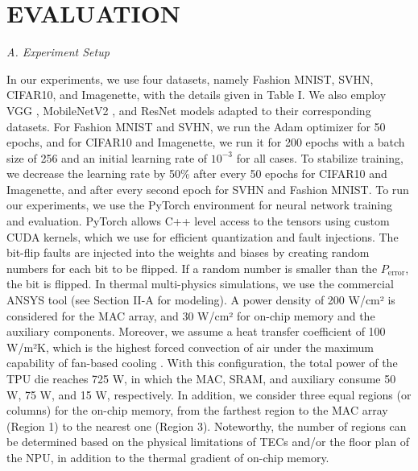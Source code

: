 \documentclass[sigconf]{acmart}
\begin{document}
\section{EVALUATION}
\textit{A. Experiment Setup}

In our experiments, we use four datasets, namely Fashion MNIST, SVHN, CIFAR10, and Imagenette, with the details given in Table I. We also employ VGG \cite{ref14} , MobileNetV2 \cite{ref15}, and ResNet \cite{ref16} models adapted to their corresponding datasets. For Fashion MNIST and SVHN, we run the Adam optimizer for 50 epochs, and for CIFAR10 and Imagenette, we run it for 200 epochs with a batch size of 256 and an initial learning rate of $10^{-3}$ for all cases. To stabilize training, we decrease the learning rate by 50\% after every 50 epochs for CIFAR10 and Imagenette, and after every second epoch for SVHN and Fashion MNIST. To run our experiments, we use the PyTorch environment for neural network training and evaluation. PyTorch allows C++ level access to the tensors using custom CUDA kernels, which we use for efficient quantization and fault injections. The bit-flip faults are injected into the weights and biases by creating random numbers for each bit to be flipped. If a random number is smaller than the $P_{\text{error}}$, the bit is flipped. In thermal multi-physics simulations, we use the commercial ANSYS tool (see Section II-A for modeling). A power density of 200 W/cm² is considered for the MAC array, and 30 W/cm² for on-chip memory and the auxiliary components. Moreover, we assume a heat transfer coefficient of 100 W/m²K, which is the highest forced convection of air under the maximum capability of fan-based cooling . With this configuration, the total power of the TPU die reaches 725 W, in which the MAC, SRAM, and auxiliary consume 50 W, 75 W, and 15 W, respectively. In addition, we consider three equal regions (or columns) for the on-chip memory, from the farthest region to the MAC array (Region 1) to the nearest one (Region 3). Noteworthy, the number of regions can be determined based on the physical limitations of TECs and/or the floor plan of the NPU, in addition to the thermal gradient of on-chip memory.
\end{document}
